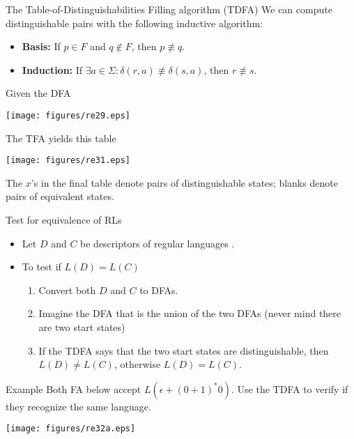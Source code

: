 \documentclass{prosper}%
\newcommand{\e} {{\mbox{$\epsilon$}}}
\begin{document}
\begin{slide}{\small The Table-of-Distinguishabilities Filling algorithm (TDFA)}
We can compute distinguishable pairs with the following inductive algorithm:
\begin{itemize}
\item {\bf Basis:} If $p\in F$ and $q\not\in F$, then $p\not\equiv q$.
\item {\bf Induction:} If $\exists a \in \Sigma: \delta(r, a)\not\equiv \delta(s, a)$,
then $r\not\equiv s$.
\end{itemize}
\begin{minipage}{6cm}
Given the DFA
\begin{center}
\texttt{[image: figures/re29.eps]}
\end{center}
\end{minipage}
\begin{minipage}{5cm}
The TFA yields this table
\begin{center}
\texttt{[image: figures/re31.eps]}
\end{center}
\end{minipage}

The $x$'s in the final table denote pairs of {\blue distinguishable} states; blanks denote pairs of {\blue equivalent} states.
\end{slide}

\begin{slide}{Test for equivalence of RLs}
\begin{itemize}
\item Let $D$ and $C$ be descriptors of regular  languages .
\item To test if $L(D) = L(C)$
\begin{enumerate}
\item Convert both $D$ and $C$ to DFAs.
\item Imagine the DFA that is the union of the two DFAs (never mind there are two start states)
\item If the TDFA says that the two start states are distinguishable, then $L(D) \neq L(C)$, otherwise $L(D) = L(C)$.
\end{enumerate}
\end{itemize}
\end{slide}

\begin{slide}{Example}
Both  FA below accept $L(\e+(0+1)^*0)$. Use the TDFA to verify if they recognize the same language.
\begin{center}
\texttt{[image: figures/re32a.eps]}
\end{center}
\end{slide}
\end{document}
